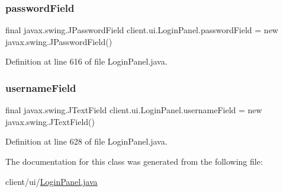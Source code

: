 \subsubsection{\texorpdfstring{password\+Field}{passwordField}}
{\footnotesize\ttfamily final javax.\+swing.\+J\+Password\+Field client.\+ui.\+Login\+Panel.\+password\+Field = new javax.\+swing.\+J\+Password\+Field()}



Definition at line 616 of file Login\+Panel.\+java.

\hypertarget{classclient_1_1ui_1_1_login_panel_a3a01950b4312782aa5d78d22d257e19e}{}\label{classclient_1_1ui_1_1_login_panel_a3a01950b4312782aa5d78d22d257e19e} 
\subsubsection{\texorpdfstring{username\+Field}{usernameField}}
{\footnotesize\ttfamily final javax.\+swing.\+J\+Text\+Field client.\+ui.\+Login\+Panel.\+username\+Field = new javax.\+swing.\+J\+Text\+Field()}



Definition at line 628 of file Login\+Panel.\+java.



The documentation for this class was generated from the following file\+:\begin{DoxyCompactItemize}
\item 
client/ui/\hyperlink{_login_panel_8java}{Login\+Panel.\+java}\end{DoxyCompactItemize}
